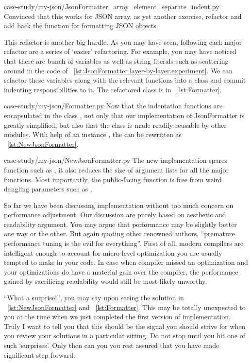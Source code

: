 
{case-study/my-json/JsonFormatter_array_element_separate_indent.py}
Convinced that this works for JSON array, as yet another exercise, refactor and add back the
function for formatting JSON objects.

This refactor is another big hurdle.
As you may have seen, following each major refactor are a series of `easier' refactoring.
For example, you may have noticed that there are bunch of variables  as
well as string literals such as  scattering around in the code of
~\autoref{lst:JsonFormatter.layer-by-layer.experiment}.
We can refactor these variables along with the relevant functions into a class
 and commit indenting responsibilities to it.
The refactored class is in ~\autoref{lst:Formatter}.

{case-study/my-json/Formatter.py}
Now that the indentation functions are encapsulated
in the class , not only that our implementation of JsonFormatter is greatly
simplified, but also that the class is made readily reusable by other modules.
With help of an instance , the  can be rewritten as
~\autoref{lst:NewJsonFormatter}.

{case-study/my-json/NewJsonFormatter.py}
The new implementation spares function such as , it also reduces the
size of argument lists for all the major functions.
Most importantly, the public-facing function is free from weird dangling parameters such as
.

So far we have been discussing implementation without too much concern on performance adjustment.
Our discussion are purely based on aesthetic and readability argument.
You may argue that performance may be slightly better one way or the other.
But again quoting other renowned authors, ``premature performance tuning is the evil for
everything''.
First of all, modern compilers are intelligent enough to account for micro-level optimization
you are usually tempted to make in your code.
In case when compiler missed an optimization and
your optimizations do have a material gain over the compiler,
the performance gained by sacrificing readability would still be most likely unworthy.

``What a surprise!'', you may say upon seeing the solution in ~\autoref{lst:NewJsonFormatter} and
~\autoref{lst:Formatter}.
This may be totally unexpected to you at the time when we just completed the first version of
implementation.
Truly I want to tell you that this should be the signal you should strive for when you review your
solutions in a particular sitting.
Do not stop until you hit one of such `surprises'.
Only then can you you rest assured that you have made significant step forward.
